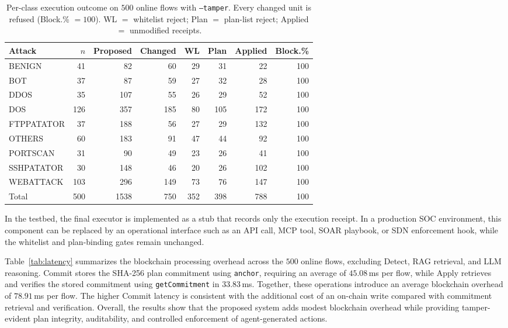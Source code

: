\documentclass[10pt, conference]{IEEEtran}
\begin{document}
\begin{table}[t]
\centering
\caption{Per-class execution outcome on $500$ online flows with \texttt{--tamper}.
Every changed unit is refused (Block.\% ${=}100$).
WL $=$ whitelist reject; Plan $=$ plan-list reject; Applied $=$ unmodified receipts.}
\label{tab:enforce}
\setlength{\tabcolsep}{3.5pt}
{\footnotesize
\begin{tabular}{@{}lrrrrrrr@{}}
\hline
Attack & $n$ & Proposed & Changed & WL & Plan & Applied & Block.\% \\
\hline
BENIGN & 41 & 82 & 60 & 29 & 31 & 22 & 100 \\
BOT & 37 & 87 & 59 & 27 & 32 & 28 & 100 \\
DDOS & 35 & 107 & 55 & 26 & 29 & 52 & 100 \\
DOS & 126 & 357 & 185 & 80 & 105 & 172 & 100 \\
FTPPATATOR & 37 & 188 & 56 & 27 & 29 & 132 & 100 \\
OTHERS & 60 & 183 & 91 & 47 & 44 & 92 & 100 \\
PORTSCAN & 31 & 90 & 49 & 23 & 26 & 41 & 100 \\
SSHPATATOR & 30 & 148 & 46 & 20 & 26 & 102 & 100 \\
WEBATTACK & 103 & 296 & 149 & 73 & 76 & 147 & 100 \\
\hline
Total & 500 & 1538 & 750 & 352 & 398 & 788 & 100 \\
\hline
\end{tabular}}
\end{table}

In the testbed, the final executor is implemented as a stub that records only the execution receipt. In a production SOC environment, this component can be replaced by an operational interface such as an API call, MCP tool, SOAR playbook, or SDN enforcement hook, while the whitelist and plan-binding gates remain unchanged.

Table~\ref{tab:latency} summarizes the blockchain processing overhead across the $500$ online flows, excluding Detect, RAG retrieval, and LLM reasoning. Commit stores the SHA-256 plan commitment using \texttt{anchor}, requiring an average of $45.08$\,ms per flow, while Apply retrieves and verifies the stored commitment using \texttt{getCommitment} in $33.83$\,ms. Together, these operations introduce an average blockchain overhead of $78.91$\,ms per flow. The higher Commit latency is consistent with the additional cost of an on-chain write compared with commitment retrieval and verification. Overall, the results show that the proposed system adds modest blockchain overhead while providing tamper-evident plan integrity, auditability, and controlled enforcement of agent-generated actions.
\end{document}
